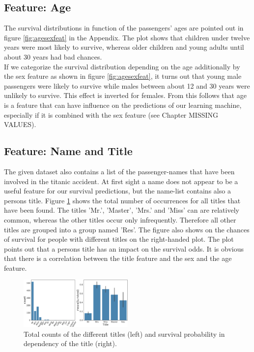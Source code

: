 \subsection*{Feature: Age}
The survival distributions in function of the passengers' ages are pointed out in figure \ref{fig:agesexfeat} in the Appendix. The plot shows that children under twelve years were most likely to survive, whereas older children and young adults until about 30 years had bad chances.\\ 
If we categorize the survival distribution depending on the age additionally by the sex feature as shown in figure \ref{fig:agesexfeat}, it turns out that young male passengers were likely to survive while males between about 12 and 30 years were unlikely to survive. This effect is inverted for females. From this follows that age is a feature that can have influence on the predictions of our learning machine, especially if it is combined with the sex feature (see Chapter MISSING VALUES).


 
 \subsection*{Feature: Name and Title}
The given dataset also contains a list of the passenger-names that have been involved in the titanic accident. At first sight a name does not appear to be a useful feature for our survival predictions, but the name-list contains also a persons title. Figure \ref{fig:title} shows the total number of occurrences for all titles that have been found. The titles 'Mr.', 'Master', 'Mrs.' and 'Miss' can are relatively common, whereas the other titles occur only infrequently. Therefore all other titles are grouped into a group named 'Res'. The figure also shows on the chances of survival for people with different titles on the right-handed plot. The plot points out that a persons title has an impact on the survival odds. It is obvious that there is a correlation between the title feature and the sex and the age feature.

 \begin{figure}
 \centering
     \includegraphics[width=0.5\textwidth]{media_saved/title}
     \caption{Total counts of the different titles (left) and survival probability in dependency of the title (right).}
     \label{fig:title}
 \end{figure}
 

